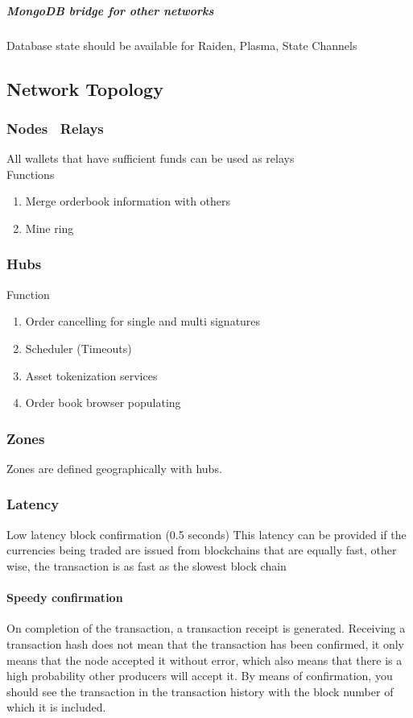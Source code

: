 \documentclass[]{article}
\begin{document}
	\subparagraph{MongoDB bridge for other networks}
	Database state should be available for Raiden, Plasma, State Channels

	\subsection{Network Topology}
	\subsubsection{Nodes \ Relays}
	All wallets that have sufficient funds can be used as relays\\
	Functions 
	\begin{enumerate}
		\item Merge orderbook information with others
		\item Mine ring 
	\end{enumerate}
	
	\subsubsection{Hubs}
	Function 
	\begin{enumerate}
		\item Order cancelling for single and multi signatures 
		\item Scheduler (Timeouts)
		\item Asset tokenization services
		\item Order book browser populating
	\end{enumerate}
	\subsubsection{Zones}
	Zones are defined geographically with hubs.
	
	
	
	\subsubsection{Latency}	
	Low latency block confirmation (0.5 seconds)
	This latency can be provided if the currencies being traded are issued from blockchains that are equally fast, other wise, the transaction is as fast as the slowest block chain
	\paragraph{Speedy confirmation}
	On completion of the transaction, a transaction receipt is generated. Receiving a transaction hash does not mean that the transaction has been confirmed, it only means that the node accepted it without error, which also means that there is a high probability other producers will accept it. By means of confirmation, you should see the transaction in the transaction history with the block number of which it is included.
\end{document}
